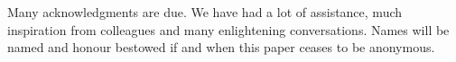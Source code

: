 \documentclass{sigplanconf}
\begin{document}
\newcommand{\Type}[1]{\star^{#1}}




%

\acks

Many acknowledgments are due. We have had a lot of assistance, much
inspiration from colleagues and many enlightening conversations. Names
will be named and honour bestowed if and when this paper ceases to be
anonymous.







%
%
\end{document}

